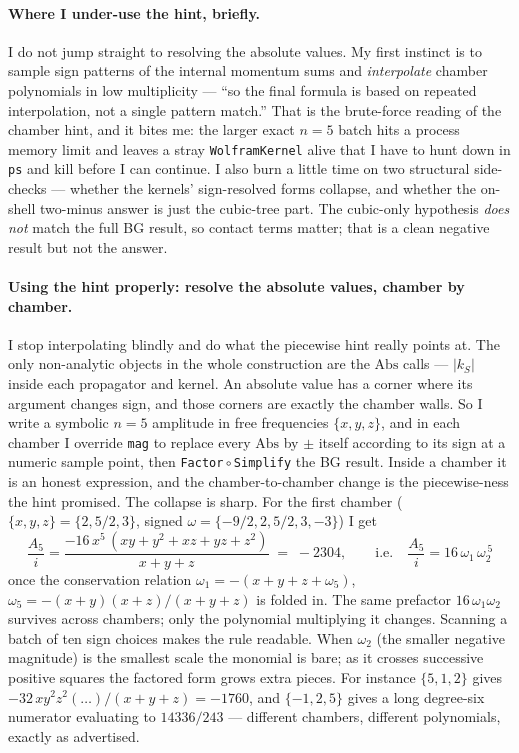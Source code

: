 \documentclass{article}
\begin{document}
\paragraph{Where I under-use the hint, briefly.}
I do not jump straight to resolving the absolute values. My first instinct is to
sample sign patterns of the internal momentum sums and \emph{interpolate} chamber
polynomials in low multiplicity --- ``so the final formula is based on repeated
interpolation, not a single pattern match.'' That is the brute-force reading of
the chamber hint, and it bites me: the larger exact $n=5$ batch hits a process
memory limit and leaves a stray \texttt{WolframKernel} alive that I have to hunt
down in \texttt{ps} and kill before I can continue. I also burn a little time on
two structural side-checks --- whether the kernels' sign-resolved forms collapse,
and whether the on-shell two-minus answer is just the cubic-tree part. The
cubic-only hypothesis \emph{does not} match the full BG result, so contact terms
matter; that is a clean negative result but not the answer.

\paragraph{Using the hint properly: resolve the absolute values, chamber by
chamber.} I stop interpolating blindly and do what the piecewise hint really
points at. The only non-analytic objects in the whole construction are the
$\mathrm{Abs}$ calls --- $|k_S|$ inside each propagator and kernel. An absolute
value has a corner where its argument changes sign, and those corners are exactly
the chamber walls. So I write a symbolic $n=5$ amplitude in free frequencies
$\{x,y,z\}$, and in each chamber I override \texttt{mag} to replace every
$\mathrm{Abs}$ by $\pm$ itself according to its sign at a numeric sample point,
then \texttt{Factor}\,$\circ$\,\texttt{Simplify} the BG result. Inside a chamber
it is an honest expression, and the chamber-to-chamber change is the
piecewise-ness the hint promised. The collapse is sharp. For the first chamber
($\{x,y,z\}=\{2,5/2,3\}$, signed $\omega=\{-9/2,2,5/2,3,-3\}$) I get
\[
\frac{A_5}{i}=\frac{-16\,x^5\,(xy+y^2+xz+yz+z^2)}{x+y+z}\;=\;-2304,
\qquad\text{i.e.}\quad \frac{A_5}{i}=16\,\omega_1\,\omega_2^{\,5}
\]
once the conservation relation $\omega_1=-(x{+}y{+}z{+}\omega_5)$,
$\omega_5=-(x{+}y)(x{+}z)/(x{+}y{+}z)$ is folded in. The same prefactor
$16\,\omega_1\omega_2$ survives across chambers; only the polynomial multiplying
it changes. Scanning a batch of ten sign choices makes the rule readable. When
$\omega_2$ (the smaller negative magnitude) is the smallest scale the monomial is
bare; as it crosses successive positive squares the factored form grows extra
pieces. For instance $\{5,1,2\}$ gives $-32\,xy^2z^2(\dots)/(x{+}y{+}z)=-1760$,
and $\{-1,2,5\}$ gives a long degree-six numerator evaluating to $14336/243$ ---
different chambers, different polynomials, exactly as advertised.
\end{document}
